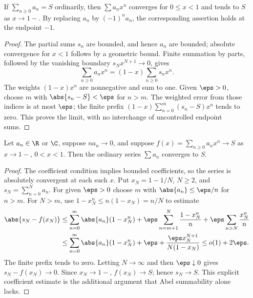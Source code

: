 \begin{theorem}
If $\sum_{n\geq0}a_n=S$ ordinarily, then $\sum a_nx^n$ converges for $0\leq x<1$ and tends to $S$ as $x\to1-$. By replacing $a_n$ by $(-1)^na_n$, the corresponding assertion holds at the endpoint $-1$.
\end{theorem}
\begin{proof}
The partial sums $s_n$ are bounded, and hence $a_n$ are bounded; absolute convergence for $x<1$ follows by a geometric bound. Finite summation by parts, followed by the vanishing boundary $s_Nx^{N+1}\to0$, gives
\[\sum_{n\geq0}a_nx^n=(1-x)\sum_{n\geq0}s_nx^n.\]
The weights $(1-x)x^n$ are nonnegative and sum to one. Given $\eps>0$, choose $m$ with $\abs{s_n-S}<\eps$ for $n>m$. The weighted error from those indices is at most $\eps$; the finite prefix $(1-x)\sum_{n=0}^m(s_n-S)x^n$ tends to zero. This proves the limit, with no interchange of uncontrolled endpoint sums.
\end{proof}

\begin{theorem}
Let $a_n\in\R$ or $\C$, suppose $na_n\to0$, and suppose $f(x)=\sum_{n\geq0}a_nx^n\to S$ as $x\to1-$, $0<x<1$. Then the ordinary series $\sum a_n$ converges to $S$.
\end{theorem}
\begin{proof}
The coefficient condition implies bounded coefficients, so the series is absolutely convergent at each such $x$. Put $x_N=1-1/N$, $N\geq2$, and $s_N=\sum_{n=0}^Na_n$. For given $\eps>0$ choose $m$ with $\abs{a_n}\leq\eps/n$ for $n>m$. For $N>m$, use $1-x_N^n\leq n(1-x_N)=n/N$ to estimate
\[\begin{split}
\abs{s_N-f(x_N)}&\leq\sum_{n=0}^m\abs{a_n}(1-x_N^n)
+\eps\sum_{n=m+1}^N\frac{1-x_N^n}{n}
+\eps\sum_{n>N}\frac{x_N^n}{n}\\
&\leq\sum_{n=0}^m\abs{a_n}(1-x_N^n)+\eps+\frac{\eps x_N^{N+1}}{N(1-x_N)}\leq o(1)+2\eps.
\end{split}\]
The finite prefix tends to zero. Letting $N\to\infty$ and then $\eps\downarrow0$ gives $s_N-f(x_N)\to0$. Since $x_N\to1-$, $f(x_N)\to S$; hence $s_N\to S$. This explicit coefficient estimate is the additional argument that Abel summability alone lacks.
\end{proof}

